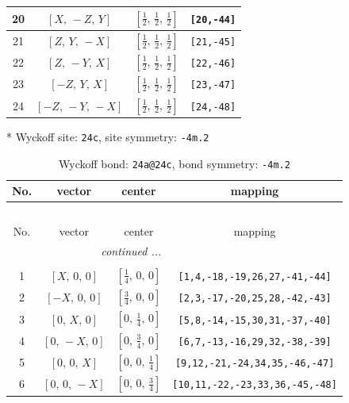 \documentclass[fleqn,8pt]{jsarticle}
\begin{document}
\begin{longtable}{cccc}
20 & $\left[ X,\, - Z,\, Y \right]$ & $\left[ \frac{1}{2},\, \frac{1}{2},\, \frac{1}{2} \right]$ & {\tt [20,-44]} \\ \hline
21 & $\left[ Z,\, Y,\, - X \right]$ & $\left[ \frac{1}{2},\, \frac{1}{2},\, \frac{1}{2} \right]$ & {\tt [21,-45]} \\ \hline
22 & $\left[ Z,\, - Y,\, X \right]$ & $\left[ \frac{1}{2},\, \frac{1}{2},\, \frac{1}{2} \right]$ & {\tt [22,-46]} \\ \hline
23 & $\left[ - Z,\, Y,\, X \right]$ & $\left[ \frac{1}{2},\, \frac{1}{2},\, \frac{1}{2} \right]$ & {\tt [23,-47]} \\ \hline
24 & $\left[ - Z,\, - Y,\, - X \right]$ & $\left[ \frac{1}{2},\, \frac{1}{2},\, \frac{1}{2} \right]$ & {\tt [24,-48]} \\
\end{longtable}
* Wyckoff site: {\tt 24c}, site symmetry: {\tt -4m.2}
\renewcommand{\arraystretch}{1.2}
\begin{longtable}{cccc}
\caption{Wyckoff bond: {\tt 24a@24c}, bond symmetry: {\tt -4m.2}}
 \\
 \hline \hline
No. & vector & center & mapping \\ \hline \endfirsthead

\multicolumn{3}{l}{\tablename\ \thetable{}} \\
 \hline \hline
No. & vector & center & mapping \\ \hline \endhead

 \hline \hline
\multicolumn{3}{r}{\footnotesize\it continued ...} \\ \endfoot

 \hline \hline
\multicolumn{3}{r}{} \\ \endlastfoot

1 & $\left[ X,\, 0,\, 0 \right]$ & $\left[ \frac{1}{4},\, 0,\, 0 \right]$ & {\tt [1,4,-18,-19,26,27,-41,-44]} \\ \hline
2 & $\left[ - X,\, 0,\, 0 \right]$ & $\left[ \frac{3}{4},\, 0,\, 0 \right]$ & {\tt [2,3,-17,-20,25,28,-42,-43]} \\ \hline
3 & $\left[ 0,\, X,\, 0 \right]$ & $\left[ 0,\, \frac{1}{4},\, 0 \right]$ & {\tt [5,8,-14,-15,30,31,-37,-40]} \\ \hline
4 & $\left[ 0,\, - X,\, 0 \right]$ & $\left[ 0,\, \frac{3}{4},\, 0 \right]$ & {\tt [6,7,-13,-16,29,32,-38,-39]} \\ \hline
5 & $\left[ 0,\, 0,\, X \right]$ & $\left[ 0,\, 0,\, \frac{1}{4} \right]$ & {\tt [9,12,-21,-24,34,35,-46,-47]} \\ \hline
6 & $\left[ 0,\, 0,\, - X \right]$ & $\left[ 0,\, 0,\, \frac{3}{4} \right]$ & {\tt [10,11,-22,-23,33,36,-45,-48]} \\
\end{longtable}
\end{document}

